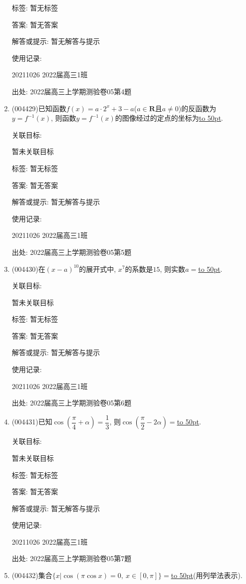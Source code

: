 \documentclass[10pt,a4paper]{article}
\newcommand{\blank}[1]{\underline{\hbox to #1pt{}}}
\begin{document}
\begin{enumerate}[1.]
标签: 暂无标签

答案: 暂无答案

解答或提示: 暂无解答与提示

使用记录:

20211026	2022届高三1班	


出处: 2022届高三上学期测验卷05第4题
\item { (004429)}已知函数$f(x)=a\cdot 2^x+3-a$($a\in \mathbf{R}$且$a\ne 0$)的反函数为$y=f^{-1}(x)$, 则函数$y=f^{-1}(x)$的图像经过的定点的坐标为\blank{50}.


关联目标:

暂未关联目标



标签: 暂无标签

答案: 暂无答案

解答或提示: 暂无解答与提示

使用记录:

20211026	2022届高三1班	


出处: 2022届高三上学期测验卷05第5题
\item { (004430)}在$(x-a)^{10}$的展开式中, $x^7$的系数是$15$, 则实数$a=$\blank{50}.


关联目标:

暂未关联目标



标签: 暂无标签

答案: 暂无答案

解答或提示: 暂无解答与提示

使用记录:

20211026	2022届高三1班	


出处: 2022届高三上学期测验卷05第6题
\item { (004431)}已知$\cos (\dfrac{\pi}4+\alpha)=\dfrac 13$, 则$\cos (\dfrac{\pi}2-2\alpha)=$\blank{50}.


关联目标:

暂未关联目标



标签: 暂无标签

答案: 暂无答案

解答或提示: 暂无解答与提示

使用记录:

20211026	2022届高三1班	


出处: 2022届高三上学期测验卷05第7题
\item { (004432)}集合$\{x|\cos(\pi \cos x)=0,\ x\in [0,\pi]\}=$\blank{50}(用列举法表示).



\end{enumerate}
\end{document}

